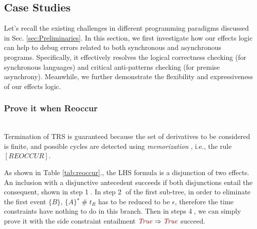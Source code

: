 \documentclass[acmsmall,10pt,review]{acmart}
\newcommand{\effect}{{\ensuremath{\mathrm{\Phi}}}}
\newcommand{\code}[1]{{\tt{\ensuremath{\m{#1}}}}}
\newcommand{\CONTAIN}{\sqsubseteq}
\newcommand{\m}{\mathit}
\newcommand{\mysharp}{{\mathrel{\texttt{\#}}}}
\newcommand\tabref[1]{Table \textcolor{black}{\ref{#1}}.}
\newcommand\secref[1]{Sec. \textcolor{black}{\ref{#1}}}
\begin{document}
{\subsection{Case Studies}
\label{subsec:Case_Studies}

Let's recall the existing challenges in different programming paradigms discussed in \secref{sec:Preliminaries}. In this section, we first investigate how our effects logic can help to debug errors related to both synchronous and asynchronous programs. Specifically, it effectively resolves the logical correctness checking (for synchronous languages) and critical anti-patterns checking (for premise asynchrony). 
Meanwhile, we further demonstrate the flexibility and expressiveness of our effects logic. 










\subsubsection{Prove it when Reoccur}~\\

Termination of TRS is guaranteed because the set of derivatives to be considered is finite, and possible cycles are detected using \emph{memorization} \cite{DBLP:conf/tableaux/Brotherston05}, i.e., the rule \code{[REOCCUR]}. %






As shown in \tabref{tab:reoccur}, the LHS formula is a 
disjunction of two effects. An inclusion with a disjunctive 
antecedent succeeds if both disjunctions entail the consequent, 
shown in step {\textcircled{1}}.  
In step \textcircled{2} of the first sub-tree, in order to eliminate the first event \code{\{B\}}, \code{\{A\}^\star \mysharp  t_R} has to be reduced to be \code{\epsilon}, therefore the time constraints have nothing to do in this branch. 
Then in steps \textcircled{4}, we
can simply prove it with the side constraint entailment \code{\textcolor {darkred}{True} \Rightarrow  \textcolor {darkred}{True}} succeed.


}
\end{document}
